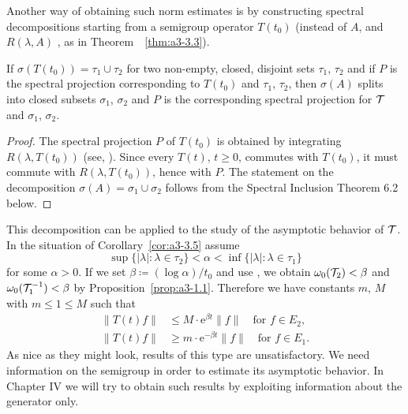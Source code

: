 Another way of obtaining such norm estimates is by constructing spectral decompositions starting from a semigroup operator $T(t_{0})$ (instead of $A$, and $R(\lambda,A)$ \resp, as in Theorem~~\ref{thm:a3-3.3}).
\begin{corollary}\label{cor:a3-3.5}
If $\sigma(T(t_{0})) = \tau_{1} \cup \tau_{2}$ for two non-empty, closed, disjoint sets $\tau_{1}$, $\tau_{2}$ and if $P$ is the spectral projection corresponding to $T(t_{0})$ and $\tau_{1}$, $\tau_{2}$, then $\sigma(A)$ splits into closed subsets $\sigma_{1}$, $\sigma_{2}$ and $P$ is the corresponding spectral projection for $\mathcal{T}$ and $\sigma_{1}$, $\sigma_{2}$.
\end{corollary}
\begin{proof}
The spectral projection $P$ of $T(t_{0})$ is obtained by integrating $R(\lambda,T(t_{0}))$ (see, \eg \citet[Section VII.3]{dunfordschwartz:1958}).
Since every $T(t)$, $t \geq 0$, commutes with $T(t_{0})$, it must commute with $R(\lambda,T(t_{0}))$, hence with $P$.
The statement on the decomposition $\sigma(A) = \sigma_{1} \cup \sigma_{2}$ follows from the Spectral Inclusion Theorem 6.2 below.
\end{proof}
This decomposition can be applied to the study of the asymptotic behavior of $\mathcal{T}$. In the situation of Corollary~\ref{cor:a3-3.5} assume
\[
\sup \{|\lambda| \colon \lambda \in \tau_{2}\} < \alpha < \inf \{|\lambda| \colon \lambda \in \tau_{1}\} 
\]
for some $\alpha > 0$. If we set $\beta \coloneqq (\log\alpha)/t_{0}$ and use 
\citet[Chap.I, Theorem~6.5]{pazy:1983}, 
we obtain $\omega_{0}(\mathcal{T}_{2}) < \beta$ and $\omega_{0}(\mathcal{T}_{1}^{-1}) < \beta$ by Proposition~\ref{prop:a3-1.1}.
Therefore we have constants $m$, $M$ with $m \le 1 \le M $ such that
\begin{align*}
	\|T(t)f\| &\leq M \cdot \mathrm{e}^{\beta t}\|f\| \quad \text{for } f \in E_{2} , \\
	\|T(t)f\| &\geq m \cdot \mathrm{e}^{-\beta t}\|f\| \quad \text{for } f \in E_{1} .
\end{align*}
As nice as they might look, results of this type are unsatisfactory. We need information on the semigroup in order to estimate its asymptotic behavior.
In Chapter IV we will try to obtain such results by exploiting information about the generator only.
